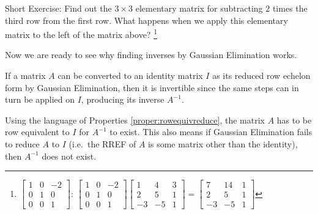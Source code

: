 Short Exercise: Find out the $3 \times 3$ elementary matrix for subtracting $2$ times the third row from the first row. What happens when we apply this elementary matrix to the left of the matrix above? \footnote{$
\begin{bmatrix}
1 & 0 & -2 \\
0 & 1 & 0 \\
0 & 0 & 1
\end{bmatrix}$:  
$\begin{bmatrix}
1 & 0 & -2 \\
0 & 1 & 0 \\
0 & 0 & 1
\end{bmatrix}
\begin{bmatrix}
1 & 4 & 3 \\
2 & 5 & 1 \\
-3 & -5 & 1
\end{bmatrix}
=
\begin{bmatrix}
7 & 14 & 1 \\
2 & 5 & 1 \\
-3 & -5 & 1
\end{bmatrix}
$}\par
Now we are ready to see why finding inverses by Gaussian Elimination works.
\begin{thm}
\label{thm:Gausselimprincip}
If a matrix $A$ can be converted to an identity matrix $I$ as its reduced row echelon form by Gaussian Elimination, then it is invertible since the same steps can in turn be applied on $I$, producing its inverse $A^{-1}$. 
\end{thm}
Using the language of Properties \ref{proper:rowequivreduce}, the matrix $A$ has to be row equivalent to $I$ for $A^{-1}$ to exist. This also means if Gaussian Elimination fails to reduce $A$ to $I$ (i.e.\ the RREF of $A$ is some matrix other than the identity), then $A^{-1}$ does not exist.
